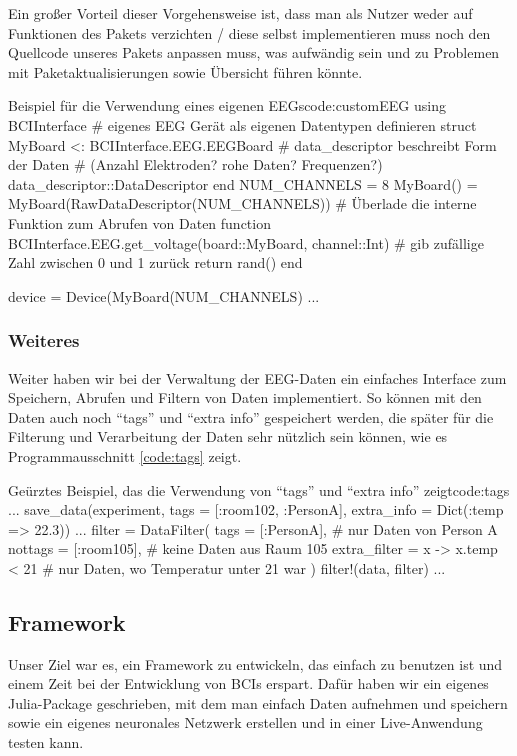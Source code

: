 \documentclass[10pt]{article}
\newcommand{\coderef}[1]{Programmausschnitt \ref{#1}}
\begin{document}
Ein großer Vorteil dieser Vorgehensweise ist, dass man als Nutzer weder auf Funktionen des Pakets verzichten / diese selbst implementieren muss noch den Quellcode unseres Pakets anpassen muss, was aufwändig sein und zu Problemen mit Paketaktualisierungen sowie Übersicht führen könnte. 

\begin{code}{Beispiel für die Verwendung eines eigenen EEGs}{code:customEEG}
using BCIInterface
# eigenes EEG Gerät als eigenen Datentypen definieren
struct MyBoard <: BCIInterface.EEG.EEGBoard
    # data_descriptor beschreibt Form der Daten
    # (Anzahl Elektroden? rohe Daten? Frequenzen?)
    data_descriptor::DataDescriptor
end
NUM_CHANNELS = 8
MyBoard() = MyBoard(RawDataDescriptor(NUM_CHANNELS))
# Überlade die interne Funktion zum Abrufen von Daten
function BCIInterface.EEG.get_voltage(board::MyBoard, channel::Int)
    # gib zufällige Zahl zwischen 0 und 1 zurück
    return rand()
end

device = Device(MyBoard(NUM_CHANNELS)
...
\end{code}

\subsubsection{Weiteres}

Weiter haben wir bei der Verwaltung der EEG-Daten ein einfaches Interface zum Speichern, Abrufen und Filtern von Daten implementiert.
So können mit den Daten auch noch \enquote{tags} und \enquote{extra info} gespeichert werden, die später für die Filterung und Verarbeitung der Daten sehr nützlich sein können, wie es \coderef{code:tags} zeigt.


\begin{code}{Geürztes Beispiel, das die Verwendung von \enquote{tags} und \enquote{extra info} zeigt}{code:tags}
...
save_data(experiment, tags = [:room102, :PersonA], 
    extra_info = Dict(:temp => 22.3))
...
filter = DataFilter(
    tags = [:PersonA], # nur Daten von Person A
    nottags = [:room105], # keine Daten aus Raum 105
    extra_filter = x -> x.temp < 21 # nur Daten, wo Temperatur unter 21 war
)
filter!(data, filter)
...
\end{code}
\subsection{Framework}

Unser Ziel war es, ein Framework zu entwickeln, das einfach zu benutzen ist und einem Zeit bei der Entwicklung von BCIs erspart. Dafür haben wir ein eigenes Julia-Package geschrieben, mit dem man einfach Daten aufnehmen und speichern sowie ein eigenes neuronales Netzwerk erstellen und in einer Live-Anwendung testen kann.
\end{document}
